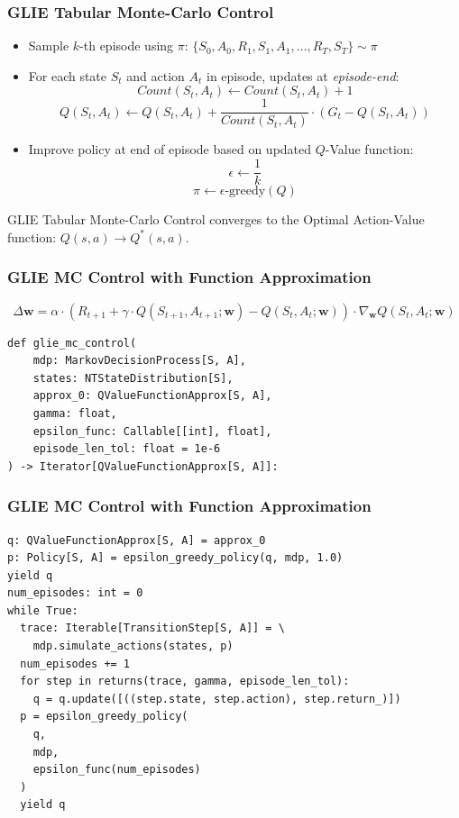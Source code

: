 \documentclass[handout]{beamer}
\begin{document}
\begin{frame}
\frametitle{GLIE Tabular Monte-Carlo Control}
\pause
\begin{itemize}[<+->]
\item  Sample $k$-th episode using $\pi$: $\{S_0, A_0, R_1, S_1, A_1, \ldots, R_T, S_T\} \sim \pi$
\item For each state $S_t$ and action $A_t$ in episode, updates at {\em episode-end}:
$$Count(S_t,A_t) \leftarrow Count(S_t,A_t) + 1$$
$$Q(S_t,A_t) \leftarrow Q(S_t,A_t) + \frac 1 {Count(S_t, A_t)} \cdot (G_t - Q(S_t,A_t))$$
\item Improve policy at end of episode based on updated $Q$-Value function:
$$\epsilon \leftarrow \frac 1 k$$
$$\pi \leftarrow \epsilon \text{-greedy}(Q)$$
\end{itemize}
\pause
\begin{theorem}
GLIE Tabular Monte-Carlo Control converges to the Optimal Action-Value function: $Q(s,a) \rightarrow Q^*(s,a)$.
\end{theorem}
\end{frame}

\begin{frame}[fragile]
\frametitle{GLIE MC Control with Function Approximation}
\pause
$$\Delta \bm{w} =  \alpha \cdot (R_{t+1} + \gamma \cdot Q(S_{t+1}, A_{t+1}; \bm{w}) - Q(S_t,A_t; \bm{w})) \cdot \nabla_{\bm{w}} Q(S_t, A_t; \bm{w})$$
\pause
\begin{lstlisting}
def glie_mc_control(
    mdp: MarkovDecisionProcess[S, A],
    states: NTStateDistribution[S],
    approx_0: QValueFunctionApprox[S, A],
    gamma: float,
    epsilon_func: Callable[[int], float],
    episode_len_tol: float = 1e-6
) -> Iterator[QValueFunctionApprox[S, A]]:
\end{lstlisting}
\end{frame}

\begin{frame}[fragile]
\frametitle{GLIE MC Control with Function Approximation}
\pause
\begin{lstlisting}
q: QValueFunctionApprox[S, A] = approx_0
p: Policy[S, A] = epsilon_greedy_policy(q, mdp, 1.0)
yield q
num_episodes: int = 0
while True:
  trace: Iterable[TransitionStep[S, A]] = \
    mdp.simulate_actions(states, p)
  num_episodes += 1
  for step in returns(trace, gamma, episode_len_tol):
    q = q.update([((step.state, step.action), step.return_)])
  p = epsilon_greedy_policy(
    q,
    mdp,
    epsilon_func(num_episodes)
  )
  yield q
\end{lstlisting}    
\end{frame}
\end{document}
